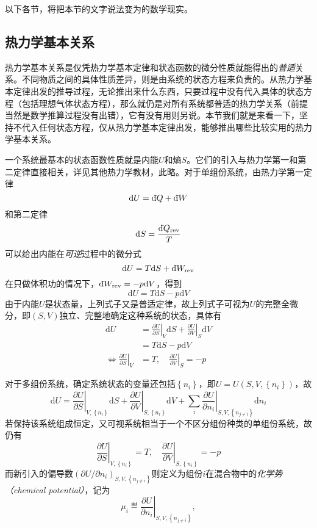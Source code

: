 \documentclass[main.tex]{subfiles}
\begin{document}
以下各节，将把本节的文字说法变为的数学现实。

\subsection{热力学基本关系}
热力学基本关系是仅凭热力学基本定律和状态函数的微分性质就能得出的\emph{普适}关系。不同物质之间的具体性质差异，则是由系统的状态方程来负责的。从热力学基本定律出发的推导过程，无论推出来什么东西，只要过程中没有代入具体的状态方程（包括理想气体状态方程），那么就仍是对所有系统都普适的热力学关系（前提当然是数学推算过程没有出错），它有没有用则另说。本节我们就是来看一下，坚持不代入任何状态方程，仅从热力学基本定律出发，能够推出哪些比较实用的热力学基本关系。

一个系统最基本的状态函数性质就是内能$U$和熵$S$。它们的引入与热力学第一和第二定律直接相关，详见其他热力学教材，此略。对于单组份系统，由热力学第一定律
\[\mathrm{d}U=\mathrm{d}\hspace*{-0.08em}\bar{}\hspace*{0.1em} Q+\mathrm{d}\hspace*{-0.08em}\bar{}\hspace*{0.1em} W\]
和第二定律
\[\mathrm{d} S=\frac{\mathrm{d}\hspace*{-0.08em}\bar{}\hspace*{0.1em} Q_\text{rev}}{T}\]
可以给出内能在\emph{可逆}过程中的微分式
\[\mathrm{d}U=T\mathrm{d}S+\mathrm{d}\hspace*{-0.08em}\bar{}\hspace*{0.1em} W_\text{rev}\]
在只做体积功的情况下，$\mathrm{d}\hspace*{-0.08em}\bar{}\hspace*{0.1em} W_\text{rev}=-p\mathrm{d}V$，得到
\[\mathrm{d}U=T\mathrm{d}S-p\mathrm{d}V\]
由于内能$U$是状态量，上列式子又是普适定律，故上列式子可视为$U$的完整全微分，即$\left(S,V\right)$独立、完整地确定这种系统的状态，具体有
\begin{align*}
  \mathrm{d}U                                                   & =\left.\frac{\partial U}{\partial S}\right|_V\mathrm{d}S+\left.\frac{\partial U}{\partial V}\right|_{S}\mathrm{d}V \\
                                                                & =T\mathrm{d}S-p\mathrm{d}V                                                                                         \\
  \Leftrightarrow\left.\frac{\partial U}{\partial S}\right|_{V} & =T,\quad\left.\frac{\partial U}{\partial V}\right|_{S}=-p
\end{align*}

对于多组份系统，确定系统状态的变量还包括$\left\{n_i\right\}$，即$U=U\left(S,V,\left\{n_i\right\}\right)$，故
\begin{equation}\label{eq:I.1_first_law_multicomp}
  \mathrm{d}U=\left.\frac{\partial U}{\partial S}\right|_{V,\left\{n_i\right\}}\mathrm{d}S+\left.\frac{\partial U}{\partial V}\right|_{S,\left\{n_i\right\}}\mathrm{d}V+\sum_i\left.\frac{\partial U}{\partial n_i}\right|_{S,V,\left\{n_{j\neq i}\right\}}\mathrm{d}n_i
\end{equation}
若保持该系统组成恒定，又可视系统相当于一个不区分组份种类的单组份系统，故仍有
\[\left.\frac{\partial U}{\partial S}\right|_{V,\left\{n_i\right\}}=T,\quad\left.\frac{\partial U}{\partial V}\right|_{S,\left\{n_i\right\}}=-p\]
而新引入的偏导数$\left(\partial U/\partial n_i\right)_{S,V,\left\{n_{j\neq i}\right\}}$则定义为组份$i$在混合物中的\emph{化学势（chemical potential）}，记为
\[\mu_i\eqdef\left.\frac{\partial U}{\partial n_i}\right|_{S,V,\left\{n_{j\neq i}\right\}},\]
\end{document}
